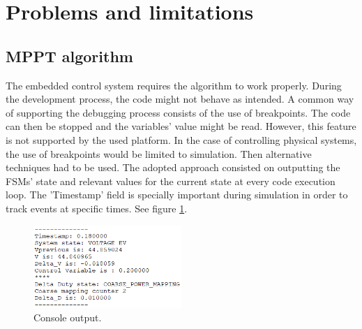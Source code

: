 \section{Problems and limitations}











\subsection{MPPT algorithm}
The embedded control system requires the algorithm to work properly. During the development process, the code might not behave as intended. A common way of supporting the debugging process consists of the use of breakpoints. 
The code can then be stopped and the variables' value might be read. However, this feature is not supported by the used platform. In the case of controlling physical systems, the use of breakpoints would be limited to simulation. Then alternative techniques had to be used. 
The adopted approach consisted on outputting the FSMs' state and relevant values for the current state at every code execution loop. 
The 'Timestamp' field is specially important during simulation in order to track events at specific times. See figure \ref{console_output}.

\begin{figure}[htbp]
	\begin{center}
		\includegraphics[width=0.5\textwidth]{../Pictures/P1/Discussion/console_output.png}
		\caption{Console output.}
		\label{console_output}
	\end{center}	
\end{figure}

